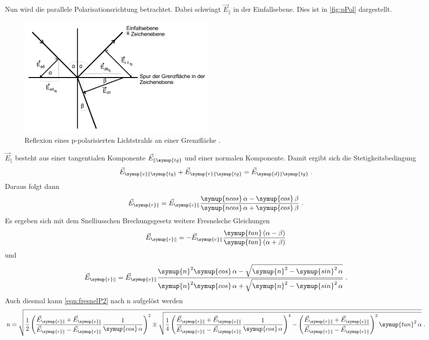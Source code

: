 Nun wird die parallele Polarisationsrichtung betrachtet. Dabei schwingt $\vec{E}_{\|}$ in der Einfallsebene. Dies ist in \autoref{fig:pPol} dargestellt.
\begin{figure}
    \centering
    \includegraphics[height = 6cm]{pPol.pdf}
    \caption{Reflexion eines p-polarisierten Lichtstrahls an einer Grenzfläche \cite{ap407}.}
    \label{fig:pPol}
\end{figure}
$\vec{E}_{\|}$ besteht aus einer tangentialen Komponente $\vec{E}_{\| \symup{tg}}$ und einer normalen Komponente. Damit ergibt sich die Stetigkeitsbedingung 
\begin{equation*}
    \vec{E}_{\symup{e}\|\symup{tg}} + \vec{E}_{\symup{r}\|\symup{tg}} = \vec{E}_{\symup{d}\|\symup{tg}} \; .
\end{equation*}
Daraus folgt dann
\begin{equation*}
    \vec{E}_{\symup{r}\|} = \vec{E}_{\symup{e}\|} \frac{\symup{ncos}\, \alpha- \symup{cos}\, \beta}{\symup{ncos}\, \alpha + \symup{cos}\,\beta} \; .
\end{equation*}
Es ergeben sich mit dem Snelliusschen Brechungsgesetz weitere Fresnelsche Gleichungen
\begin{equation}
    \vec{E}_{\symup{r}\|} = - \vec{E}_{\symup{e}\|} \frac{\symup{tan}\left(\alpha - \beta\right)}{\symup{tan}\left(\alpha + \beta\right)}
    \label{eqn:fresnelP1}
\end{equation}
und
\begin{equation}
    \vec{E}_{\symup{r}\|} = \vec{E}_{\symup{e}\|}\frac{\symup{n}^2\symup{cos}\, \alpha - \sqrt{\symup{n}^2-\symup{sin}^2\,\alpha}}{\symup{n}^2\symup{cos}\, \alpha + \sqrt{\symup{n}^2-\symup{sin}^2\,\alpha}} \; .
    \label{eqn:fresnelP2}
\end{equation}
Auch diesmal kann \autoref{eqn:fresnelP2} nach n aufgelöst werden
\begin{equation}
    n = \sqrt{\frac{1}{2}\left(\frac{\vec{E}_{\symup{r}\|}+\vec{E}_{\symup{e}\|}}{\vec{E}_{\symup{r}\|}-\vec{E}_{\symup{e}\|}}\frac{1}{\symup{cos}\,\alpha}\right)^2 \pm 
    \sqrt{\frac{1}{4}\left(\frac{\vec{E}_{\symup{r}\|}+\vec{E}_{\symup{e}\|}}{\vec{E}_{\symup{r}\|}-\vec{E}_{\symup{e}\|}}\frac{1}{\symup{cos}\,\alpha}\right)^4 - 
    \left(\frac{\vec{E}_{\symup{r}\|}+\vec{E}_{\symup{e}\|}}{\vec{E}_{\symup{r}\|}-\vec{E}_{\symup{e}\|}}\right)^2 \symup{tan}^2\, \alpha}} \; .
    \label{eqn:n90}
\end{equation}
